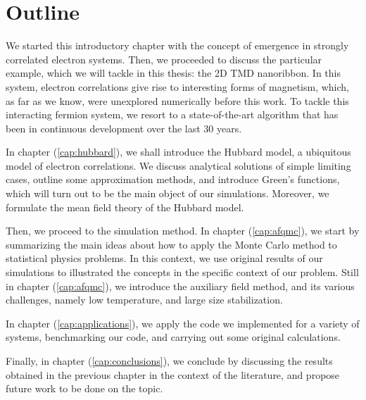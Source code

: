 \section{Outline}
\label{sec:int_outline}

We started this introductory chapter with the concept of emergence in strongly correlated electron systems.
Then, we proceeded to discuss the particular example, which we will tackle in this thesis: the \acs{2D} \acs{TMD} nanoribbon.
In this system, electron correlations give rise to interesting forms of magnetism, which, as far as we know, were unexplored numerically before this work.
To tackle this interacting fermion system, we resort to a  state-of-the-art algorithm that has been in continuous development over the last 30 years.

In chapter (\ref{cap:hubbard}), we shall introduce the Hubbard model, a ubiquitous model of electron correlations.
We discuss analytical solutions of simple limiting cases, outline some approximation methods, and introduce Green's functions, which will turn out to be the main object of our simulations.
Moreover, we formulate the mean field theory of the Hubbard model.

Then, we proceed to the simulation method.
In chapter (\ref{cap:afqmc}), we start by summarizing the main ideas about how to apply the Monte Carlo method to statistical physics problems.
In this context, we use original results of our simulations to illustrated the concepts in the specific context of our problem.
Still in chapter (\ref{cap:afqmc}), we introduce the auxiliary field method, and its various challenges, namely low temperature, and large size stabilization.

In chapter (\ref{cap:applications}), we apply the code we implemented for a variety of systems, benchmarking our code, and carrying out some original calculations.

Finally, in chapter (\ref{cap:conclusions}), we conclude by discussing the results obtained in the previous chapter in the context of the literature, and propose future work to be done on the topic.